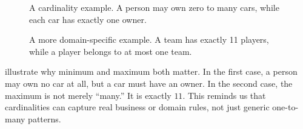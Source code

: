 \documentclass[11pt,a4paper,openany]{book}
\begin{document}
\begin{figure}[tbp]
\centering
\begin{minipage}[t]{0.47\linewidth}
\centering
\begin{adjustbox}{max width=\linewidth,max totalheight=0.22\textheight,center}
\end{adjustbox}
\caption{A cardinality example. A person may own zero to many cars, while each car has exactly one owner.}
\label{fig:er-cardinality-owns}
\end{minipage}\hfill
\begin{minipage}[t]{0.47\linewidth}
\centering
\begin{adjustbox}{max width=\linewidth,max totalheight=0.22\textheight,center}
\end{adjustbox}
\caption{A more domain-specific example. A team has exactly 11 players, while a player belongs to at most one team.}
\label{fig:er-cardinality-team}
\end{minipage}
\end{figure}

 illustrate why minimum and maximum both matter. In the first case, a person may own no car at all, but a car must have an owner. In the second case, the maximum is not merely ``many.'' It is exactly \(11\). This reminds us that cardinalities can capture real business or domain rules, not just generic one-to-many patterns.
\end{document}
